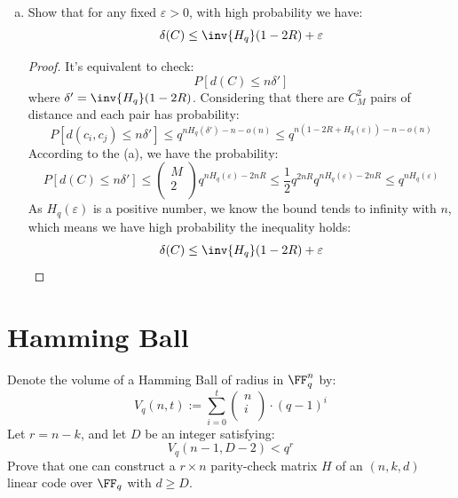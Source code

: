 \begin{enumerate}[(a)]
\item Show that for any fixed \( \varepsilon > 0 \), with high probability we have:
\[
    \delta(C) 
    \le \inv{ H_q } ( 1 - 2R ) + \varepsilon
\]
\begin{proof}
    It's equivalent to check:
    \[
        P[ d(C) \le n \delta' ]
    \]
    where \( \delta' = \inv{ H_q }(1 - 2R) \). Considering that there are \( C_M^2 \) pairs of distance and each pair has probability:
    \[
        P[ d( c_i, c_j ) \le n\delta' ] 
        \le q^{ nH_q(\delta') - n -o(n) }
        \le q^{ n(1 - 2R + H_q( \varepsilon )) - n - o(n) }
    \]
    According to the (a), we have the probability:
    \[ 
        P[ d(C) \le n\delta' ] 
        \le \begin{pmatrix}
            M \\ 
            2 \\
        \end{pmatrix}
        q^{ nH_q( \varepsilon ) -2nR }
        \le 
        \frac{1}{2} q^{ 2nR } q^{ nH_q( \varepsilon ) - 2nR }
        \le 
        q^{ nH_q( \varepsilon ) }
    \]
    As \( H_q( \varepsilon ) \) is a positive number, we know the bound tends to infinity with \( n \), which means we have high probability the inequality holds:
    \[
        \delta(C) \le \inv{ H_q }( 1 - 2R ) + \varepsilon
    \]
\end{proof}





\end{enumerate}

\section{Hamming Ball}
Denote the volume of a Hamming Ball of radius in \( \FF_q^n \) by:
\[
    V_q( n, t ) := \sum_{ i = 0 }^t \begin{pmatrix}
        n \\ 
        i \\
    \end{pmatrix} 
    \cdot 
    ( q - 1 )^i
\]
Let \( r = n - k \), and let \( D \) be an integer satisfying:
\[
    V_q( n - 1, D - 2 ) < q^r 
\]
Prove that one can construct a \( r \times n \) parity-check matrix \( H \) of an \( ( n, k, d ) \) linear code over \( \FF_q \) with \( d \ge D \).


